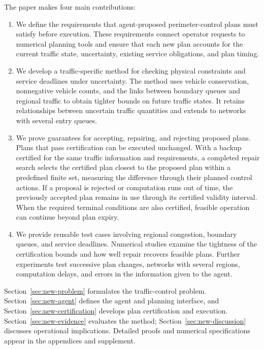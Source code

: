\documentclass[preprint,12pt]{elsarticle}
\begin{document}
The paper makes four main contributions:
\begin{enumerate}
\item We define the requirements that agent-proposed perimeter-control plans
must satisfy before execution. These requirements connect operator requests
to numerical planning tools and ensure that each new plan accounts for the
current traffic state, uncertainty, existing service obligations, and plan
timing.

\item We develop a traffic-specific method for checking physical constraints
and service deadlines under uncertainty. The method uses vehicle
conservation, nonnegative vehicle counts, and the links between boundary
queues and regional traffic to obtain tighter bounds on future traffic
states. It retains relationships between uncertain traffic quantities and
extends to networks with several entry queues.

\item We prove guarantees for accepting, repairing, and rejecting proposed
plans. Plans that pass certification can be executed unchanged. With a
backup certified for the same traffic information and requirements, a
completed repair search selects the certified plan closest to the proposed
plan within a predefined finite set, measuring the difference through their
planned control actions. If a proposal is rejected or computation runs out
of time, the previously accepted plan remains in use through its certified
validity interval. When the required terminal conditions are also certified,
feasible operation can continue beyond plan expiry.

\item We provide reusable test cases involving regional congestion, boundary
queues, and service deadlines. Numerical studies examine the tightness of
the certification bounds and how well repair recovers feasible plans.
Further experiments test successive plan changes, networks with several
regions, computation delays, and errors in the information given to the
agent.
\end{enumerate}

Section~\ref{sec:new-problem} formulates the traffic-control problem. Section~\ref{sec:new-agent} defines the agent and planning interface, and Section~\ref{sec:new-certification} develops plan certification and execution. Section~\ref{sec:new-evidence} evaluates the method; Section~\ref{sec:new-discussion} discusses operational implications. Detailed proofs and numerical specifications appear in the appendices and supplement.
\end{document}
